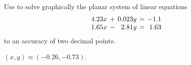 \documentclass{ximera}
\begin{document}
\begin{computerExercise} \label{c2.2.2}
Use \Matlab to solve graphically the planar system of linear
equations
\[
\arraycolsep 2pt
\begin{array}{rcrcr}
4.23x & + & 0.023y & = & -1.1 \\
1.65x & - & 2.81y & = &  1.63
\end{array}
\]
to an accuracy of two decimal points.

\begin{solution}

$(x,y) \approx (-0.26,-0.73)$.


\end{solution}
\end{computerExercise}
\end{document}
